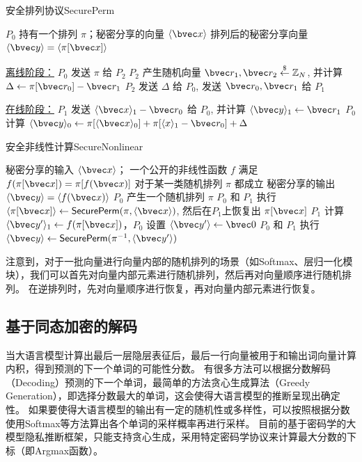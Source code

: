 \begin{algorithm}[H]
    \caption{安全排列协议\textsf{SecurePerm}}
    \label{alg:secure_perm}
    \begin{algorithmic}[1]
    \Require $P_0$ 持有一个排列 $\pi$；秘密分享的向量 $\langle \bvec x \rangle$
    \Ensure 排列后的秘密分享向量 $\langle \bvec y \rangle  = \langle \pi[\bvec x] \rangle$
    \item[\underline{离线阶段：}]
    \State $P_0$ 发送 $\pi$ 给 $P_2$
    \State $P_2$ 产生随机向量 $\bvec r_1, \bvec r_2 \stackrel{\$}{\gets} \mathbb Z_N $, 并计算 $\Delta \gets \pi[\bvec r_0] - \bvec r_1$
    \State $P_2$ 发送 $\Delta$ 给 $P_0$, 发送 $\bvec r_0, \bvec r_1$ 给 $P_1$
    \item[\underline{在线阶段：}]
    \State $P_1$ 发送 $\langle \bvec x \rangle_1 - \bvec r_0$ 给 $P_0$, 并计算 $\langle \bvec y \rangle_1 \gets \bvec r_1$
    \State $P_0$ 计算 $\langle \bvec y \rangle_0 \gets \pi[\langle \bvec x \rangle_0] + \pi[\langle x \rangle_1 - \bvec r_0] + \Delta$
    \end{algorithmic}
\end{algorithm}

\begin{algorithm}[h]
\caption{安全非线性计算\textsf{SecureNonlinear}}
\label{alg:perm-llm:nonlinear}
\begin{algorithmic}[1]
\Require  
    秘密分享的输入 $\langle \bvec x \rangle$；
    一个公开的非线性函数 $f$ 满足 $f(\pi[\bvec x]) = \pi[f(\bvec x)]$ 对于某一类随机排列 $\pi$ 都成立
\Ensure 秘密分享的输出 $\langle \bvec y \rangle = \langle f(\bvec x) \rangle$
\State $P_0$ 产生一个随机排列 $\pi$
\State $P_0$ 和 $P_1$ 执行 $\langle \pi[\bvec x] \rangle \gets \mathsf{SecurePerm}(\pi, \langle \bvec x \rangle)$, 然后在$P_1$上恢复出 $\pi[\bvec x]$
\State $P_1$ 计算 $\langle \bvec y' \rangle_1 \gets f(\pi[\bvec x])$，$P_0$ 设置 $\langle \bvec y' \rangle \gets \bvec 0$
\State $P_0$ 和 $P_1$ 执行 $\langle \bvec y \rangle \gets \mathsf{SecurePerm}(\pi^{-1}, \langle \bvec y' \rangle)$
\end{algorithmic}
\end{algorithm}

注意到，对于一批向量进行向量内部的随机排列的场景（如Softmax、层归一化模块），我们可以首先对向量内部元素进行随机排列，然后再对向量顺序进行随机排列。
%
在逆排列时，先对向量顺序进行恢复，再对向量内部元素进行恢复。
%

\subsection{基于同态加密的解码}
当大语言模型计算出最后一层隐层表征后，最后一行向量被用于和输出词向量计算内积，得到预测的下一个单词的可能性分数。
%
有很多方法可以根据分数解码（Decoding）预测的下一个单词，最简单的方法贪心生成算法（Greedy Generation），即选择分数最大的单词，这会使得大语言模型的推断呈现出确定性。
%
如果要使得大语言模型的输出有一定的随机性或多样性，可以按照根据分数使用Softmax等方法算出各个单词的采样概率再进行采样。
%
目前的基于密码学的大模型隐私推断框架，只能支持贪心生成，采用特定密码学协议来计算最大分数的下标（即Argmax函数）。
%

